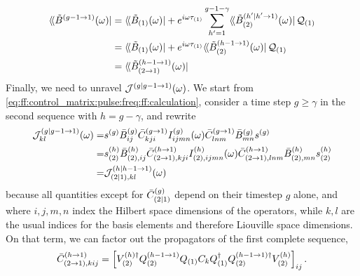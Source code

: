 \begin{align}\label{eq:app:ff:ctrlmat_cumulative:12}
    \dbra*{\Bt\gth{g-1\to 1}(\omega)} &= \dbra*{\Bt_{(1)}(\omega)} + \e^{\i\omega\tau_{(1)}}\sum_{h^{\prime}=1}^{g-1-\gamma}
                                            \dbra*{\Bt_{(2)}\gth{h^{\prime}|h^{\prime}\to 1}(\omega)}\liouvQ_{(1)} \notag \\
                                      &= \dbra*{\Bt_{(1)}(\omega)} + \e^{\i\omega\tau_{(1)}}\dbra*{\Bt_{(2)}\gth{h-1\to 1}(\omega)}\liouvQ_{(1)} \notag \\
                                      &= \dbra*{\Bt_{(2\to 1)}\gth{h-1\to 1}(\omega)}
\end{align}
Finally, we need to unravel $\mathcal{J}^{(g|g-1\to 1)}(\omega)$.
We start from \cref{eq:ff:control_matrix:pulse:freq:ff:calculation}, consider a time step $g\geq\gamma$ in the second sequence with $h = g-\gamma$, and rewrite
\begin{align}\label{eq:app:ff:filter_function:incomplete_timestep:12}
        \mathcal{J}_{kl}^{(g|g-1\to 1)}(\omega) =& s^{(g)} \bar{B}_{ij}^{(g)} \bar{C}_{kji}^{(g\to 1)} I_{ijmn}^{(g)}(\omega)
                                                \bar{C}_{lnm}^{(g\to 1)} \bar{B}_{mn}^{(g)} s^{(g)} \notag \\
                                            =& s_{(2)}^{(h)} \bar{B}_{(2),ij}^{(h)} \bar{C}_{(2\to 1),kji}^{(h\to 1)} I_{(2),ijmn}^{(h)}(\omega)
                                                \bar{C}_{(2\to 1),lnm}^{(h\to 1)} \bar{B}_{(2),mn}^{(h)} s_{(2)}^{(h)} \notag \\
                                            =& \mathcal{J}_{(2|1),kl}^{(h|h-1\to 1)}(\omega)
\end{align}
because all quantities except for $\bar{C}_{(2|1)}^{(g)}$ depend on their timestep $g$ alone, and where $i,j,m,n$ index the Hilbert space dimensions of the operators, while $k,l$ are the usual indices for the basis elements and therefore Liouville space dimensions.
On that term, we can factor out the propagators of the first complete sequence,
\begin{align}\label{eq:app:ff:basis_transformed}
    \bar{C}_{(2\to 1),kij}^{(h\to 1)} = \left[
        V_{(2)}^{(h)\dagger}Q_{(2)}^{(h-1\to 1)} Q_{(1)} C_k Q_{(1)}^\dagger Q_{(2)}^{(h-1\to 1)\dagger}V_{(2)}^{(h)}
    \right]_{ij}.
\end{align}

